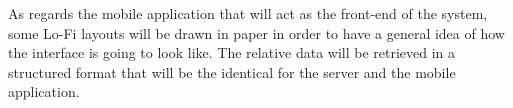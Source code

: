 As regards the mobile application that will act as the front-end of the system, some Lo-Fi layouts will be drawn in paper in order to have a general idea of how the interface is going to look like. The relative data will be retrieved in a structured format that will be the identical for the server and the mobile application.

